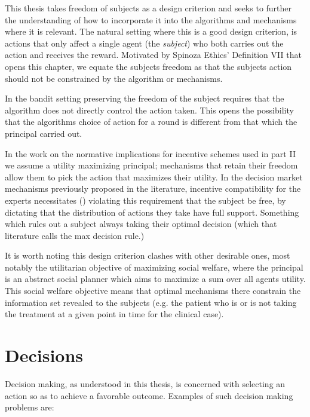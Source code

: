 This thesis takes freedom of subjects as a design criterion and seeks to further the understanding of how to incorporate it into the  algorithms and mechanisms where it is relevant.
The natural setting where this is a good design criterion, is actions that only affect a single agent (the \emph{subject}) who both carries out the action and receives the reward.
Motivated by Spinoza Ethics' Definition VII that opens this chapter, we equate the subjects freedom as that the subjects action should not be constrained by the algorithm or mechanisms.

In the bandit setting preserving the freedom of the subject requires that the algorithm does not directly control the action taken.
This opens the possibility that the algorithms choice of action for a round is different from that which the principal carried out.

In the work on the normative implications for incentive schemes used in part II we assume a utility maximizing principal; mechanisms that retain their freedom allow them to pick the action that maximizes their utility.
In the decision market mechanisms previously proposed in the literature, incentive compatibility for the experts necessitates (\cite{othman2010decision,chen2014eliciting}) violating this requirement that the subject be free, by dictating that the distribution of actions they take have full support. Something which rules out a subject always taking their optimal decision (which that literature calls the max decision rule.)


It is worth noting this design criterion clashes with other desirable ones, most notably the utilitarian objective of maximizing social welfare, where the principal is an abstract social planner which aims to maximize a sum over all agents utility. This social welfare objective means that optimal mechanisms there \cite{kremer2014implementing,mansour2015bayesian,mansour2016bayesian} constrain the information set revealed to the subjects (e.g. the patient who is or is not taking the treatment at a given point in time for the clinical case).







\section{Decisions}

Decision making, as understood in this thesis, is concerned with selecting an action so as to achieve a favorable outcome.
Examples of such decision making problems are:

